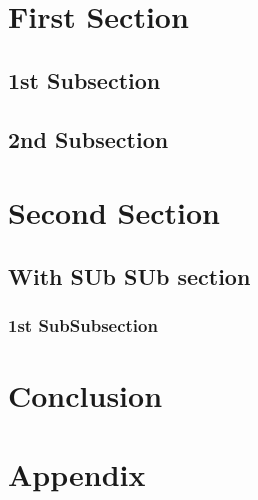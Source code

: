 \documentclass{article}
\begin{document}


\section{First Section}\cite{Dummy1}
    \lipsum[1]
    \subsection{1st Subsection}
        \lipsum[2]
    \subsection{2nd Subsection}
        \lipsum[3]


\section{Second Section}
    \lipsum[4]
    \subsection{With SUb SUb section}
        \lipsum[5]
        \subsubsection{1st SubSubsection}
            \lipsum[6]

\section{Conclusion}
    \lipsum[7]

\newpage
{}



\section*{Appendix}
    \lipsum[7]
\end{document}
